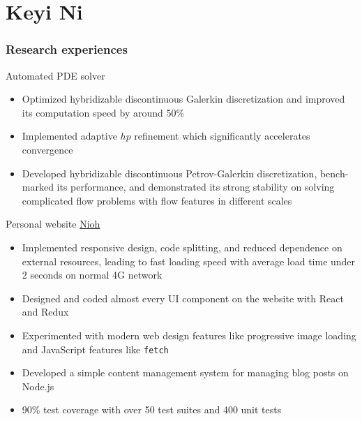 \documentclass{tccv}
\begin{document}
\part{Keyi Ni}

\section{Research experiences}

\begin{eventlist}
  {Automated PDE solver}
  \begin{itemize}[leftmargin=*]
  \item Optimized hybridizable discontinuous Galerkin discretization and improved its computation speed by around 50\%
  \item Implemented adaptive $hp$ refinement which significantly accelerates convergence
  \item Developed hybridizable discontinuous Petrov-Galerkin discretization, bench-marked its performance, and demonstrated its strong stability on solving complicated flow problems with flow features in different scales
  \end{itemize}
  
  {Personal website \href{https://www.nioh.ca}{Nioh}}
  \begin{itemize}
    \item Implemented responsive design, code splitting, and reduced dependence on external resources, leading to fast loading speed with average load time under 2 seconds on normal 4G network
    \item Designed and coded almost every UI component on the website with React and Redux 
    \item Experimented with modern web design features like progressive image loading and JavaScript features like \texttt{fetch}
    \item Developed a simple content management system for managing blog posts on Node.js
    \item 90\% test coverage with over 50 test suites and 400 unit tests
  \end{itemize}




\end{eventlist}
\end{document}
